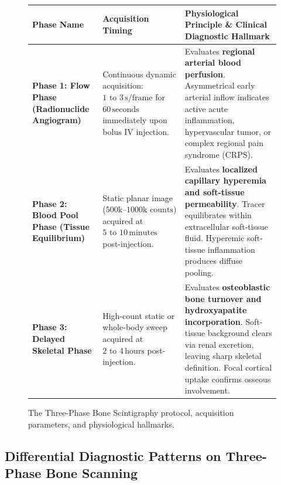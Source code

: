 \documentclass[11pt,a4paper]{article}
\begin{document}
\begin{figure}[htbp]
\centering
\setlength{\tabcolsep}{4pt}
\begin{tabular}{p{3.2cm}p{3.8cm}p{7.4cm}}
\toprule
\textbf{Phase Name} & \textbf{Acquisition Timing} & \textbf{Physiological Principle \& Clinical Diagnostic Hallmark} \\
\midrule
\textbf{Phase 1: Flow Phase (Radionuclide Angiogram)} & Continuous dynamic acquisition: $1\text{ to }3\,\text{s/frame}$ for $60\,\text{seconds}$ immediately upon bolus IV injection. & Evaluates \textbf{regional arterial blood perfusion}. Asymmetrical early arterial inflow indicates active acute inflammation, hypervascular tumor, or complex regional pain syndrome (CRPS). \\
\addlinespace
\textbf{Phase 2: Blood Pool Phase (Tissue Equilibrium)} & Static planar image ($500\text{k--}1000\text{k counts}$) acquired at $5\text{ to }10\,\text{minutes}$ post-injection. & Evaluates \textbf{localized capillary hyperemia and soft-tissue permeability}. Tracer equilibrates within extracellular soft-tissue fluid. Hyperemic soft-tissue inflammation produces diffuse pooling. \\
\addlinespace
\textbf{Phase 3: Delayed Skeletal Phase} & High-count static or whole-body sweep acquired at $2\text{ to }4\,\text{hours}$ post-injection. & Evaluates \textbf{osteoblastic bone turnover and hydroxyapatite incorporation}. Soft-tissue background clears via renal excretion, leaving sharp skeletal definition. Focal cortical uptake confirms osseous involvement. \\
\bottomrule
\end{tabular}
\caption{The Three-Phase Bone Scintigraphy protocol, acquisition parameters, and physiological hallmarks.}
\label{tab:three_phase_bone}
\end{figure}

\subsection{Differential Diagnostic Patterns on Three-Phase Bone Scanning}
\end{document}
